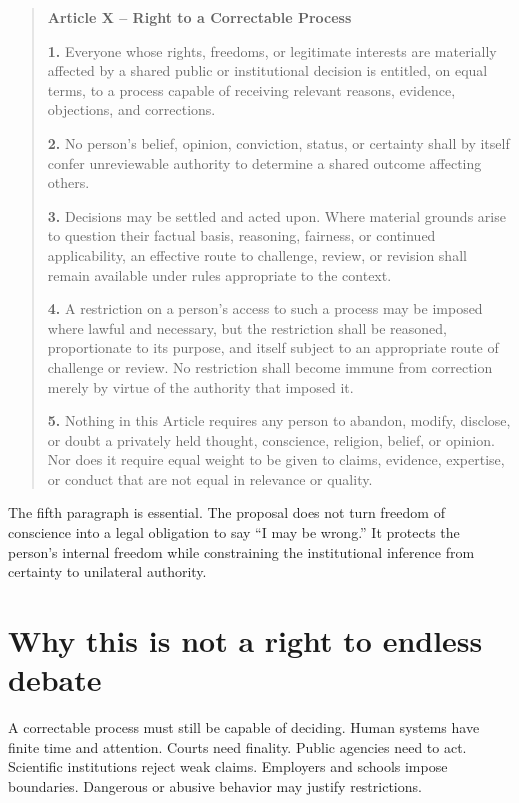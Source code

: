 \documentclass[11pt,a4paper]{article}
\begin{document}
\begin{quote}
\textbf{Article X -- Right to a Correctable Process}

\textbf{1.} Everyone whose rights, freedoms, or legitimate interests are materially affected by a shared public or institutional decision is entitled, on equal terms, to a process capable of receiving relevant reasons, evidence, objections, and corrections.

\textbf{2.} No person's belief, opinion, conviction, status, or certainty shall by itself confer unreviewable authority to determine a shared outcome affecting others.

\textbf{3.} Decisions may be settled and acted upon. Where material grounds arise to question their factual basis, reasoning, fairness, or continued applicability, an effective route to challenge, review, or revision shall remain available under rules appropriate to the context.

\textbf{4.} A restriction on a person's access to such a process may be imposed where lawful and necessary, but the restriction shall be reasoned, proportionate to its purpose, and itself subject to an appropriate route of challenge or review. No restriction shall become immune from correction merely by virtue of the authority that imposed it.

\textbf{5.} Nothing in this Article requires any person to abandon, modify, disclose, or doubt a privately held thought, conscience, religion, belief, or opinion. Nor does it require equal weight to be given to claims, evidence, expertise, or conduct that are not equal in relevance or quality.
\end{quote}

The fifth paragraph is essential. The proposal does not turn freedom of conscience into a legal obligation to say ``I may be wrong.'' It protects the person's internal freedom while constraining the institutional inference from certainty to unilateral authority.

\section{Why this is not a right to endless debate}

A correctable process must still be capable of deciding. Human systems have finite time and attention. Courts need finality. Public agencies need to act. Scientific institutions reject weak claims. Employers and schools impose boundaries. Dangerous or abusive behavior may justify restrictions.
\end{document}
